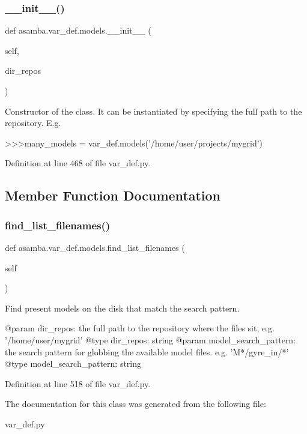 \subsubsection{\texorpdfstring{\+\_\+\+\_\+init\+\_\+\+\_\+()}{\_\_init\_\_()}}
{\footnotesize\ttfamily def asamba.\+var\+\_\+def.\+models.\+\_\+\+\_\+init\+\_\+\+\_\+ (\begin{DoxyParamCaption}\item[{}]{self,  }\item[{}]{dir\+\_\+repos }\end{DoxyParamCaption})}

\begin{DoxyVerb}Constructor of the class. It can be instantiated by specifying the full path to the repository. 
E.g.

>>>many_models = var_def.models('/home/user/projects/mygrid')\end{DoxyVerb}
 

Definition at line 468 of file var\+\_\+def.\+py.



\subsection{Member Function Documentation}
\mbox{\label{classasamba_1_1var__def_1_1models_ae0babd86feff61275e38952a7cc23282}} 
\subsubsection{\texorpdfstring{find\+\_\+list\+\_\+filenames()}{find\_list\_filenames()}}
{\footnotesize\ttfamily def asamba.\+var\+\_\+def.\+models.\+find\+\_\+list\+\_\+filenames (\begin{DoxyParamCaption}\item[{}]{self }\end{DoxyParamCaption})}

\begin{DoxyVerb}Find present models on the disk that match the search pattern.

@param dir_repos: the full path to the repository where the files sit, e.g. '/home/user/mygrid'
@type dir_repos: string
@param model_search_pattern: the search pattern for globbing the available model files. e.g.
  'M*/gyre_in/*'
@type model_search_pattern: string
\end{DoxyVerb}
 

Definition at line 518 of file var\+\_\+def.\+py.



The documentation for this class was generated from the following file\+:\begin{DoxyCompactItemize}
\item 
var\+\_\+def.\+py\end{DoxyCompactItemize}
